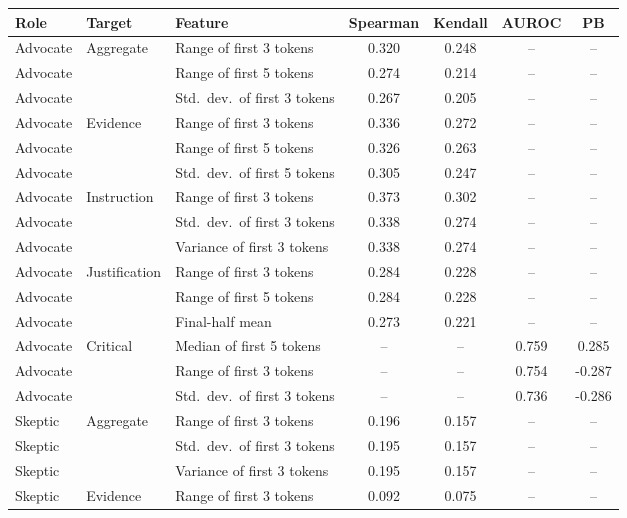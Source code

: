 \documentclass[11pt]{article}
\begin{document}
\begin{table}[t]
\centering
\scriptsize
\begin{tabular}{l l l c c c c}
\toprule
Role & Target & Feature & Spearman & Kendall & AUROC & PB \\
\midrule
Advocate & Aggregate     & Range of first 3 tokens & 0.320 & 0.248 & -- & -- \\
Advocate &               & Range of first 5 tokens & 0.274 & 0.214 & -- & -- \\
Advocate &               & Std.\ dev.\ of first 3 tokens & 0.267 & 0.205 & -- & -- \\
\midrule
Advocate & Evidence      & Range of first 3 tokens & 0.336 & 0.272 & -- & -- \\
Advocate &               & Range of first 5 tokens & 0.326 & 0.263 & -- & -- \\
Advocate &               & Std.\ dev.\ of first 5 tokens & 0.305 & 0.247 & -- & -- \\
\midrule
Advocate & Instruction   & Range of first 3 tokens & 0.373 & 0.302 & -- & -- \\
Advocate &               & Std.\ dev.\ of first 3 tokens & 0.338 & 0.274 & -- & -- \\
Advocate &               & Variance of first 3 tokens & 0.338 & 0.274 & -- & -- \\
\midrule
Advocate & Justification & Range of first 3 tokens & 0.284 & 0.228 & -- & -- \\
Advocate &               & Range of first 5 tokens & 0.284 & 0.228 & -- & -- \\
Advocate &               & Final-half mean & 0.273 & 0.221 & -- & -- \\
\midrule
Advocate & Critical      & Median of first 5 tokens & -- & -- & 0.759 & 0.285 \\
Advocate &               & Range of first 3 tokens  & -- & -- & 0.754 & -0.287 \\
Advocate &               & Std.\ dev.\ of first 3 tokens & -- & -- & 0.736 & -0.286 \\
\midrule
Skeptic  & Aggregate     & Range of first 3 tokens & 0.196 & 0.157 & -- & -- \\
Skeptic  &               & Std.\ dev.\ of first 3 tokens & 0.195 & 0.157 & -- & -- \\
Skeptic  &               & Variance of first 3 tokens & 0.195 & 0.157 & -- & -- \\
\midrule
Skeptic  & Evidence      & Range of first 3 tokens & 0.092 & 0.075 & -- & -- \\

\end{tabular}
\end{table}
\end{document}
